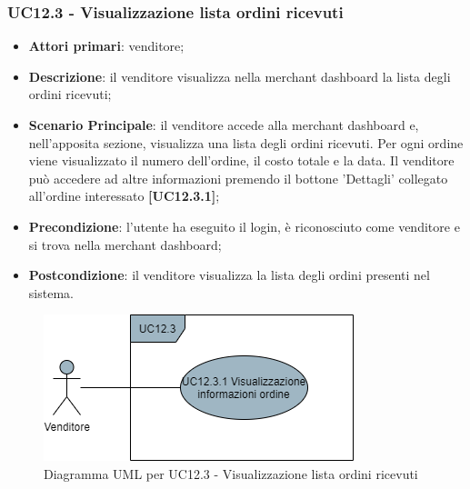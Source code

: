 \subsubsection{UC12.3 - Visualizzazione lista ordini ricevuti}
\begin{itemize}
\item \textbf{Attori primari}: venditore;
\item \textbf{Descrizione}: il venditore visualizza nella merchant dashboard la lista degli ordini ricevuti;
\item \textbf{Scenario Principale}: il venditore accede alla merchant dashboard e, nell'apposita sezione, visualizza una lista degli ordini ricevuti. Per ogni ordine viene visualizzato il numero dell'ordine, il costo totale e la data. Il venditore può accedere ad altre informazioni premendo il bottone 'Dettagli' collegato all'ordine interessato \textbf{[UC12.3.1]};
\item \textbf{Precondizione}: l'utente ha eseguito il login, è riconosciuto come venditore e si trova nella merchant dashboard;
\item \textbf{Postcondizione}: il venditore visualizza la lista degli ordini presenti nel sistema.
\end{itemize}

\begin{figure}[H]
\centering
\includegraphics[scale=0.6]{res/UseCase/Immagini/VisualizzazioneOrdiniMerchant}
\caption{Diagramma UML per UC12.3 - Visualizzazione lista ordini ricevuti}
\end{figure}

